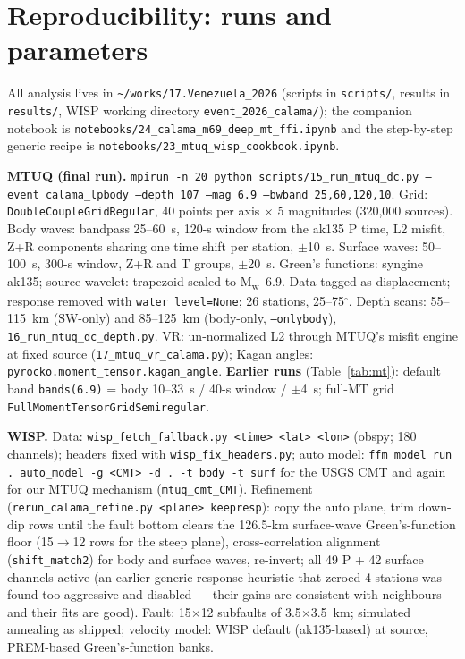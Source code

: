 \documentclass[11pt]{article}
\newcommand{\Mw}{M\textsubscript{w}}
\begin{document}
\appendix
\section{Reproducibility: runs and parameters}
All analysis lives in \texttt{\textasciitilde/works/17.Venezuela\_2026} (scripts in
\texttt{scripts/}, results in \texttt{results/}, WISP working directory
\texttt{event\_2026\_calama/}); the companion notebook is
\texttt{notebooks/24\_calama\_m69\_deep\_mt\_ffi.ipynb} and the step-by-step generic recipe is
\texttt{notebooks/23\_mtuq\_wisp\_cookbook.ipynb}.

\textbf{MTUQ (final run).} \texttt{mpirun -n 20 python scripts/15\_run\_mtuq\_dc.py --event
calama\_lpbody --depth 107 --mag 6.9 --bwband 25,60,120,10}. Grid:
\texttt{DoubleCoupleGridRegular}, 40 points per axis $\times$ 5 magnitudes (320{,}000
sources). Body waves: bandpass 25--60~s, 120-s window from the ak135 P time, L2 misfit,
Z+R components sharing one time shift per station, $\pm$10~s. Surface waves: 50--100~s, 300-s
window, Z+R and T groups, $\pm$20~s. Green's functions: syngine ak135; source wavelet:
trapezoid scaled to \Mw~6.9. Data tagged as displacement; response removed with
\texttt{water\_level=None}; 26 stations, 25--75$^\circ$. Depth scans: 55--115~km (SW-only) and
85--125~km (body-only, \texttt{--onlybody}), \texttt{16\_run\_mtuq\_dc\_depth.py}. VR:
un-normalized L2 through MTUQ's misfit engine at fixed source
(\texttt{17\_mtuq\_vr\_calama.py}); Kagan angles: \texttt{pyrocko.moment\_tensor.kagan\_angle}.
\textbf{Earlier runs} (Table~\ref{tab:mt}): default band \texttt{bands(6.9)} = body 10--33~s
/ 40-s window / $\pm$4~s; full-MT grid \texttt{FullMomentTensorGridSemiregular}.

\textbf{WISP.} Data: \texttt{wisp\_fetch\_fallback.py <time> <lat> <lon>} (obspy; 180
channels); headers fixed with \texttt{wisp\_fix\_headers.py}; auto model:
\texttt{ffm model run . auto\_model -g <CMT> -d . -t body -t surf} for the USGS CMT and again
for our MTUQ mechanism (\texttt{mtuq\_cmt\_CMT}). Refinement
(\texttt{rerun\_calama\_refine.py <plane> keepresp}): copy the auto plane, trim down-dip rows
until the fault bottom clears the 126.5-km surface-wave Green's-function floor
(15$\to$12 rows for the steep plane), cross-correlation alignment (\texttt{shift\_match2}) for
body and surface waves, re-invert; all 49 P + 42 surface channels active (an earlier
generic-response heuristic that zeroed 4 stations was found too aggressive and disabled ---
their gains are consistent with neighbours and their fits are good). Fault: 15$\times$12
subfaults of 3.5$\times$3.5~km; simulated annealing as shipped; velocity model: WISP default
(ak135-based) at source, PREM-based Green's-function banks.
\end{document}
